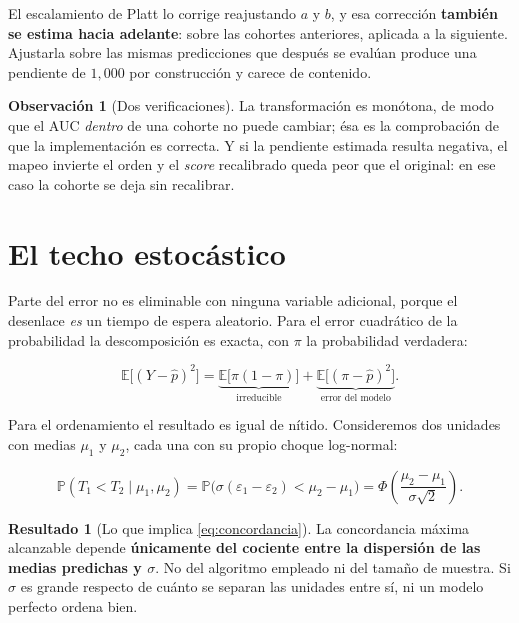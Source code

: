 \documentclass[11pt,a4paper]{article}
\theoremstyle{definition}
\newtheorem{resultado}{Resultado}
\newtheorem{observacion}{Observación}
\newcommand{\E}{\mathbb{E}}
\newcommand{\Prob}{\mathbb{P}}
\begin{document}
El escalamiento de Platt \cite{platt1999} lo corrige reajustando $a$ y $b$, y esa
corrección \textbf{también se estima hacia adelante}: sobre las cohortes
anteriores, aplicada a la siguiente. Ajustarla sobre las mismas predicciones que
después se evalúan produce una pendiente de $1{,}000$ por construcción y carece
de contenido.

\begin{observacion}[Dos verificaciones]
La transformación es monótona, de modo que el AUC \emph{dentro} de una cohorte no
puede cambiar; ésa es la comprobación de que la implementación es correcta. Y si
la pendiente estimada resulta negativa, el mapeo invierte el orden y el
\emph{score} recalibrado queda peor que el original: en ese caso la cohorte se
deja sin recalibrar.
\end{observacion}

\section{El techo estocástico}

Parte del error no es eliminable con ninguna variable adicional, porque el
desenlace \emph{es} un tiempo de espera aleatorio. Para el error cuadrático de la
probabilidad la descomposición es exacta, con $\pi$ la probabilidad verdadera:

\begin{equation}
\E\bigl[(Y-\hat{p})^2\bigr]
=\underbrace{\E\bigl[\pi(1-\pi)\bigr]}_{\text{irreducible}}
+\underbrace{\E\bigl[(\pi-\hat{p})^2\bigr]}_{\text{error del modelo}} .
\label{eq:brier}
\end{equation}

Para el ordenamiento el resultado es igual de nítido. Consideremos dos unidades
con medias $\mu_1$ y $\mu_2$, cada una con su propio choque log-normal:

\begin{equation}
\Prob(T_1<T_2\mid \mu_1,\mu_2)
=\Prob\bigl(\sigma(\varepsilon_1-\varepsilon_2)<\mu_2-\mu_1\bigr)
=\Phi\!\left(\frac{\mu_2-\mu_1}{\sigma\sqrt{2}}\right).
\label{eq:concordancia}
\end{equation}

\begin{resultado}[Lo que implica \eqref{eq:concordancia}]
La concordancia máxima alcanzable depende \textbf{únicamente del cociente entre la
dispersión de las medias predichas y $\sigma$}. No del algoritmo empleado ni del
tamaño de muestra. Si $\sigma$ es grande respecto de cuánto se separan las
unidades entre sí, ni un modelo perfecto ordena bien.
\end{resultado}
\end{document}

